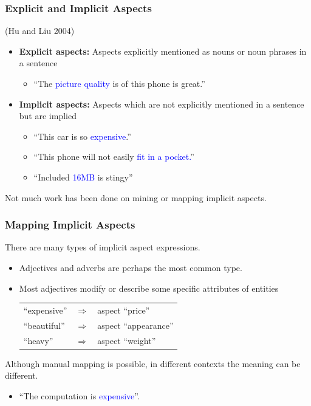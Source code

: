 \documentclass[t]{beamer}
\begin{document}
\begin{frame} \frametitle{Explicit and Implicit Aspects} %

(Hu and Liu 2004)

\begin{itemize}
\item \textbf{Explicit aspects:} Aspects explicitly mentioned as nouns
  or noun phrases in a sentence 
\begin{itemize}
\item ``The \textcolor{blue}{picture quality} is of this phone is great.''
\end{itemize}

\item \textbf{Implicit aspects:} Aspects which are not explicitly
  mentioned in a sentence but are implied 
\begin{itemize}
\item ``This car is so \textcolor{blue}{expensive}.'' 
\item ``This phone will not easily \textcolor{blue}{fit in a pocket.}'' 
\item ``Included \textcolor{blue}{16MB} is stingy''
\end{itemize}

\end{itemize}

Not much work has been done on mining or mapping implicit aspects.


\end{frame}


\begin{frame} \frametitle{Mapping Implicit Aspects} %


There are many types of implicit aspect expressions. 
\begin{itemize}
\item Adjectives and adverbs are perhaps the most common type.
\item Most adjectives modify or describe some specific attributes of
  entities \\ 
\begin{tabular}{lcl}
``expensive'' & $\Rightarrow$ & aspect ``price'' \\
``beautiful''  & $\Rightarrow$ & aspect ``appearance''  \\
``heavy''  &  $\Rightarrow$ & aspect ``weight''
\end{tabular}

\end{itemize}


\vfill
Although manual mapping is possible, in different contexts the meaning can be different.
\begin{itemize}
\item ``The computation is \textcolor{blue}{expensive}''.
\end{itemize}

\end{frame}
\end{document}
